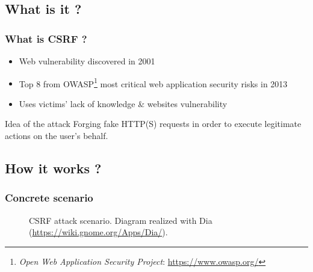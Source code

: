 \documentclass[svgnames]{beamer}
\begin{document}
\subsection{What is it ?}
\begin{frame}
  \frametitle{What is CSRF ?}
  \begin{itemize}
   \item Web vulnerability discovered in 2001
   \item Top 8 from OWASP\footnote{\textit{Open Web Application 
       Security Project}: \url{https://www.owasp.org/}} most critical 
   web application security risks in 2013
   \item Uses victims' lack of knowledge \& websites vulnerability
  \end{itemize}
  
  \pause
  
  \begin{block}{Idea of the attack}
    Forging fake HTTP(S) requests in order to execute legitimate actions on the user's behalf.
  \end{block}

  


\end{frame}

\subsection{How it works ?}
\begin{frame}
  \frametitle{Concrete scenario}
  \begin{figure}[h!t]
  \begin{center}
    \caption{
      CSRF attack scenario. Diagram realized with Dia (\url{https://wiki.gnome.org/Apps/Dia/}).
    }
  \end{center}
  \end{figure}
\end{frame}
\end{document}

